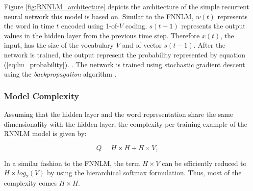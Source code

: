Figure \ref{fig:RNNLM_architecture} depicts the architecture of the simple
recurrent neural network this model is based on. Similar to the \ac{FNNLM},    $w(t)$ represents the word in time $t$ encoded using 1-of-$V$ coding.  $s(t-1)$ represents the output values in the
hidden layer from the previous time step. Therefore $x(t)$, the input, has
the size of the vocabulary $V$ and of vector $s(t-1)$. After the network is
trained, the output represent the probability represented by equation
(\ref{eq:lm_probability}).  \cite{mikolovphd2012}. The network is trained
using stochastic gradient descent using the
\textit{backpropagation} algorithm \cite{conf/interspeech/MikolovKBCK10,Bishop:1995:NNP:525960}.


\subsubsection{Model Complexity}
\label{sec:sub:sub:mikolov_rnnlm_complexity}

Assuming that the hidden layer and the word representation share the same
dimensionality with the hidden layer, the complexity per training example of the \ac{RNNLM} model is
given by:


\begin{equation} Q = H \times H + H \times V,   \end{equation}

In a similar fashion to the \ac{FNNLM}, the term $H \times V$ can be
efficiently reduced to $H \times log_2(V)$ by using the hierarchical softmax
formulation. Thus, most of the complexity comes $H \times H$.







